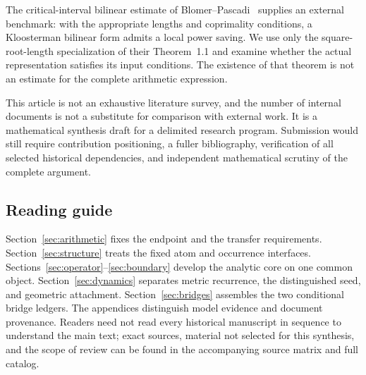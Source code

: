 The critical-interval bilinear estimate of Blomer--Pascadi~\cite{blomer2026} supplies an external benchmark: with the appropriate lengths and coprimality conditions, a Kloosterman bilinear form admits a local power saving. We use only the square-root-length specialization of their Theorem~1.1 and examine whether the actual representation satisfies its input conditions. The existence of that theorem is not an estimate for the complete arithmetic expression.

This article is not an exhaustive literature survey, and the number of internal documents is not a substitute for comparison with external work. It is a mathematical synthesis draft for a delimited research program. Submission would still require contribution positioning, a fuller bibliography, verification of all selected historical dependencies, and independent mathematical scrutiny of the complete argument.

\subsection{Reading guide}
Section~\ref{sec:arithmetic} fixes the endpoint and the transfer requirements. Section~\ref{sec:structure} treats the fixed atom and occurrence interfaces. Sections~\ref{sec:operator}--\ref{sec:boundary} develop the analytic core on one common object. Section~\ref{sec:dynamics} separates metric recurrence, the distinguished seed, and geometric attachment. Section~\ref{sec:bridges} assembles the two conditional bridge ledgers. The appendices distinguish model evidence and document provenance.
Readers need not read every historical manuscript in sequence to understand the main text; exact sources, material not selected for this synthesis, and the scope of review can be found in the accompanying source matrix and full catalog.
